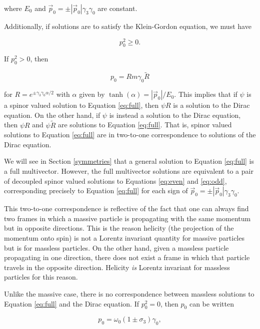 \documentclass{article}
\begin{document}
  where $E_0$ and $\vec p_0 = \pm |\vec p_0| \gamma_3 \gamma_0$ are constant.

  Additionally, if solutions are to satisfy the Klein-Gordon equation, we must have 

  \begin{equation}
    p_0^2 \geq 0.
  \end{equation}

  If $p_0^2 > 0$, then 

  \begin{equation}
    p_0 = R m \gamma_0 \widetilde R\label{eq:R}
  \end{equation} 

  for $R = e^{\pm \gamma_3 \gamma_0 \alpha/2}$ with $\alpha$ given by $\tanh(\alpha) = |\vec p_0|/E_0$. This implies that if $\psi$ is a spinor valued solution to Equation \ref{eq:full}, then $\psi R$ is a solution to the Dirac equation. On the other hand, if $\psi$ is instead a solution to the Dirac equation, then $\psi R$ and $\psi \widetilde R$ are solutions to Equation \ref{eq:full}. That is, spinor valued solutions to Equation \ref{eq:full} are in two-to-one correspondence to solutions of the Dirac equation. 

  We will see in Section \ref{symmetries} that a general solution to Equation \ref{eq:full} is a full multivector. However, the full multivector solutions are equivalent to a pair of decoupled spinor valued solutions to Equations \ref{eq:even} and \ref{eq:odd}, corresponding precisely to Equation \ref{eq:full} for each sign of $\vec p_0 = \pm |\vec p_0| \gamma_3 \gamma_0$.

  This two-to-one correspondence is reflective of the fact that one can always find two frames in which a massive particle is propagating with the same momentum but in opposite directions. This is the reason helicity (the projection of the momentum onto spin) is not a Lorentz invariant quantity for massive particles but is for massless particles. On the other hand, given a massless particle propagating in one direction, there does not exist a frame in which that particle travels in the opposite direction. Helicity \emph{is} Lorentz invariant for massless particles for this reason.

  Unlike the massive case, there is no correspondence between massless solutions to Equation \ref{eq:full} and the Dirac equation.  If $p_0^2 = 0$, then $p_0$ can be written

  \begin{equation}
    p_0 = \omega_0 (1 \pm \sigma_3) \gamma_0, \label{eq:massless}
  \end{equation}
\end{document}
